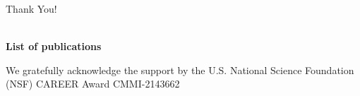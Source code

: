 \documentclass[8pt,xcolor=dvipsnames,compress]{beamer}
\begin{document}
\begin{frame}
    \begin{center}
        \Huge{Thank You!}
    \end{center} \\
    
    \scriptsize{\textbf{List of publications}}\\
    \scriptsize
    \begin{enumerate}

        
    \end{enumerate}
    \begin{center}
    \scriptsize
        We gratefully acknowledge the support by the U.S. National Science Foundation (NSF) CAREER Award CMMI-2143662\\

    \end{center}
\end{frame}
    
\end{document}
